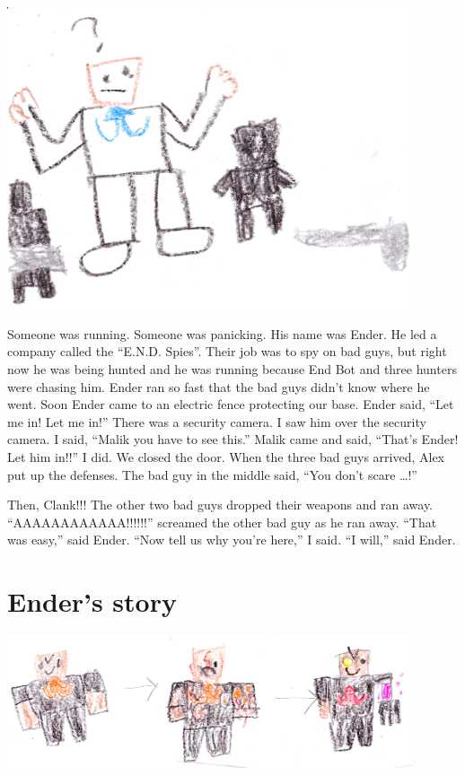\documentclass[letterpaper, oneside, 12pt]{krantz}
\begin{document}
\includegraphics[width=4.6875in,height=\textheight]{img/four-bad-guys/scared.jpg}

Someone was running. Someone was panicking. His name was Ender. He led a
company called the ``E.N.D. Spies''. Their job was to spy on bad guys,
but right now he was being hunted and he was running because End Bot and
three hunters were chasing him. Ender ran so fast that the bad guys
didn't know where he went. Soon Ender came to an electric fence
protecting our base. Ender said, ``Let me in! Let me in!'' There was a
security camera. I saw him over the security camera. I said, ``Malik you
have to see this.'' Malik came and said, ``That's Ender! Let him in!!''
I did. We closed the door. When the three bad guys arrived, Alex put up
the defenses. The bad guy in the middle said, ``You don't scare
\ldots{}!''

Then, Clank!!! The other two bad guys dropped their weapons and ran
away. ``AAAAAAAAAAAA!!!!!!'' screamed the other bad guy as he ran away.
``That was easy,'' said Ender. ``Now tell us why you're here,'' I said.
``I will,'' said Ender.

\hypertarget{enders-story}{%
\section{Ender's story}\label{enders-story}}

\includegraphics[width=4.6875in,height=\textheight]{img/four-bad-guys/armstrong.jpg}
\end{document}
